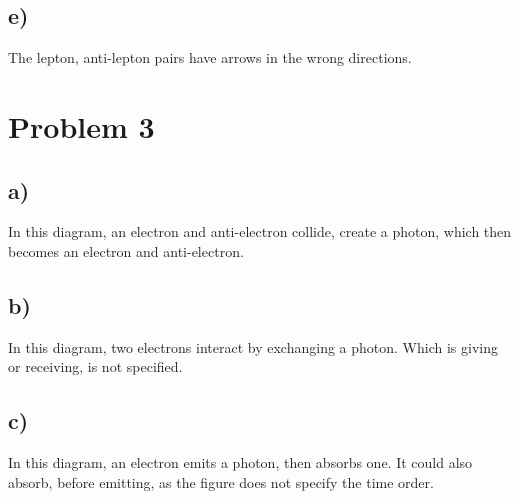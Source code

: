 \documentclass{article}
\begin{document}
\subsection*{e)}
The lepton, anti-lepton pairs have arrows in the wrong directions. 


\section*{Problem 3}
\subsection*{a)}
In this diagram, an electron and anti-electron collide, create a photon, which then becomes an electron and anti-electron. 

\subsection*{b)}
In this diagram, two electrons interact by exchanging a photon. Which is giving or receiving, is not specified. 

\subsection*{c)}
In this diagram, an electron emits a photon, then absorbs one. It could also absorb, before emitting, as the figure does not specify the time order. 
\end{document}

